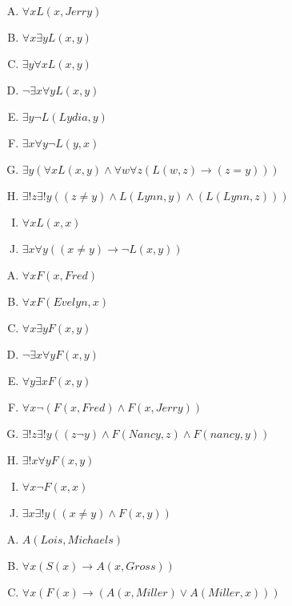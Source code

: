 {{        %
        \begin{practices}
            \begin{enumerate}[A.]
                \item $\forall x L(x, Jerry)$
                \item $\forall x \exists y L(x, y)$
                \item $\exists y \forall x L(x, y)$
                \item $\neg \exists x \forall y L(x, y)$
                \item $\exists y \neg L(Lydia, y)$
                \item $\exists x \forall y \neg L(y, x)$
                 \item $\exists y (\forall x L(x, y) \wedge \forall w \forall z (L(w, z) \rightarrow (z = y)))$
                 \item $\exists ! z \exists ! y ((z \neq y) \wedge L(Lynn, y) \wedge (L(Lynn, z)))$
                \item $\forall x L(x, x)$
                 \item $\exists x \forall y ((x \neq y) \rightarrow \neg L(x, y))$
            \end{enumerate}
        \end{practices}

        \begin{practices}
            \begin{enumerate}[A.]
                \item $\forall x F(x, Fred)$
                \item $\forall x F(Evelyn, x)$
                \item $\forall x \exists y F(x, y)$
                \item $\neg \exists x \forall y F(x, y)$
                \item $\forall y \exists x F(x, y)$
                \item $\forall x \neg (F(x, Fred) \wedge F(x, Jerry))$
                 \item $\exists ! z \exists ! y ((z \neg y) \wedge F(Nancy, z) \wedge F(nancy, y))$
                 \item $\exists ! x \forall y F(x, y)$
                \item $\forall x \neg F(x, x)$
                 \item $\exists x \exists ! y ((x \neq y) \wedge F(x, y))$
            \end{enumerate}
        \end{practices}

        \begin{practices}
            \begin{enumerate}[A.]
                \item $A(Lois, Michaels)$
                \item $\forall x (S(x) \rightarrow A(x, Gross))$
                \item $\forall x (F(x) \rightarrow (A(x, Miller) \vee A(Miller, x)))$
            \end{enumerate}
        \end{practices}
    }
}
